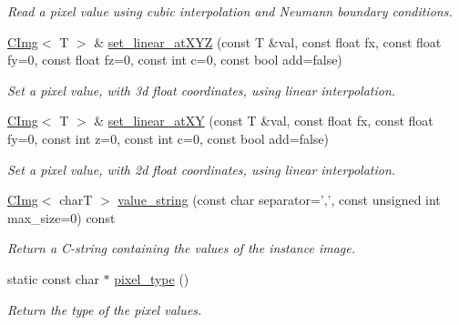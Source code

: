 \begin{DoxyCompactItemize}
\begin{DoxyCompactList}\small\item\em Read a pixel value using cubic interpolation and Neumann boundary conditions. \item\end{DoxyCompactList}\item 
\hypertarget{structcimg__library_1_1CImg_a25a6addb8958b5775369ad0af3179c8b}{
\hyperlink{structcimg__library_1_1CImg}{CImg}$<$ T $>$ \& \hyperlink{structcimg__library_1_1CImg_a25a6addb8958b5775369ad0af3179c8b}{set\_\-linear\_\-atXYZ} (const T \&val, const float fx, const float fy=0, const float fz=0, const int c=0, const bool add=false)}
\label{structcimg__library_1_1CImg_a25a6addb8958b5775369ad0af3179c8b}

\begin{DoxyCompactList}\small\item\em Set a pixel value, with 3d float coordinates, using linear interpolation. \item\end{DoxyCompactList}\item 
\hypertarget{structcimg__library_1_1CImg_adc7bcb85adf6fde46546cfab4f3aa2b3}{
\hyperlink{structcimg__library_1_1CImg}{CImg}$<$ T $>$ \& \hyperlink{structcimg__library_1_1CImg_adc7bcb85adf6fde46546cfab4f3aa2b3}{set\_\-linear\_\-atXY} (const T \&val, const float fx, const float fy=0, const int z=0, const int c=0, const bool add=false)}
\label{structcimg__library_1_1CImg_adc7bcb85adf6fde46546cfab4f3aa2b3}

\begin{DoxyCompactList}\small\item\em Set a pixel value, with 2d float coordinates, using linear interpolation. \item\end{DoxyCompactList}\item 
\hypertarget{structcimg__library_1_1CImg_a2d70c422e3e75e6cd810358486387300}{
\hyperlink{structcimg__library_1_1CImg}{CImg}$<$ charT $>$ \hyperlink{structcimg__library_1_1CImg_a2d70c422e3e75e6cd810358486387300}{value\_\-string} (const char separator=',', const unsigned int max\_\-size=0) const }
\label{structcimg__library_1_1CImg_a2d70c422e3e75e6cd810358486387300}

\begin{DoxyCompactList}\small\item\em Return a C-\/string containing the values of the instance image. \item\end{DoxyCompactList}\item 
static const char $\ast$ \hyperlink{structcimg__library_1_1CImg_ab7d3a61366cf906c03af6c8fa13309a7}{pixel\_\-type} ()
\begin{DoxyCompactList}\small\item\em Return the type of the pixel values. \item\end{DoxyCompactList}\end{DoxyCompactItemize}
